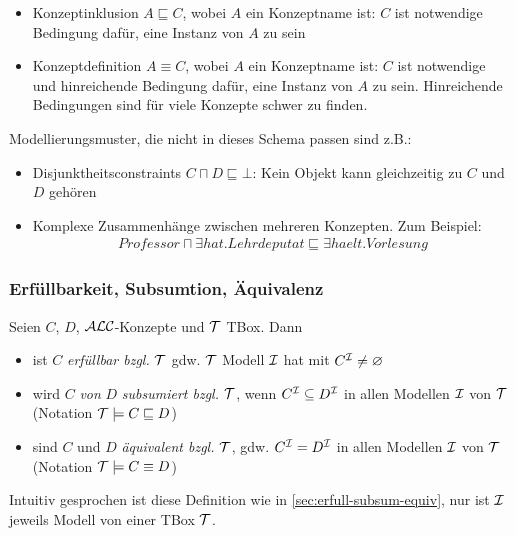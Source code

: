 \begin{itemize}
\item Konzeptinklusion $A \sqsubseteq C$, wobei $A$ ein Konzeptname ist: $C$ ist notwendige Bedingung dafür, eine Instanz von $A$ zu sein
\item Konzeptdefinition $A \equiv C$, wobei $A$ ein Konzeptname ist: $C$ ist notwendige und hinreichende Bedingung dafür, eine Instanz von $A$ zu sein.
    Hinreichende Bedingungen sind für viele Konzepte schwer zu finden.
    \end{itemize}
Modellierungsmuster, die nicht in dieses Schema passen sind z.B.:
\begin{itemize}
\item Disjunktheitsconstraints $C \sqcap D \sqsubseteq \bot$: Kein Objekt kann gleichzeitig zu $C$ und $D$ gehören
\item Komplexe Zusammenhänge zwischen mehreren Konzepten. Zum Beispiel:
    \begin{align*}
        \mathit{Professor} \sqcap \exists \mathit{hat}.\mathit{Lehrdeputat} \sqsubseteq \exists \mathit{haelt}.\mathit{Vorlesung}
    \end{align*}
\end{itemize}

\subsubsection{Erfüllbarkeit, Subsumtion, Äquivalenz}
\label{sec:tbox-erfuellbarkeit}
\label{erfuxfcllbarkeit-subsumtion-uxe4quivalenz-1}

\begin{definition} 
Seien $C$, $D$, $\mathcal{A}\mathcal{L}\mathcal{C}$-Konzepte und $\mathcal{T}$ TBox. Dann

\begin{itemize}
  \item ist $C$ \emph{erfüllbar bzgl.} $\mathcal{T}$ gdw. $\mathcal{T}$ Modell $\mathcal{I}$ hat mit $C^{\mathcal{I}} \neq \varnothing$
  \item wird $C$ \emph{von} $D$ \emph{subsumiert bzgl.} $\mathcal{T}$, wenn $C^{\mathcal{I}} \subseteq D^{\mathcal{I}}$ in allen Modellen $\mathcal{I}$ von $\mathcal{T}$ (Notation $\mathcal{T} \models C \sqsubseteq D$)
  \item sind $C$ und $D$ \emph{äquivalent bzgl.} $\mathcal{T}$, gdw. $C^{\mathcal{I}} = D^{\mathcal{I}}$ in allen Modellen $\mathcal{I}$ von $\mathcal{T}$ (Notation $\mathcal{T} \models C \equiv D$)
\end{itemize}
\end{definition}

Intuitiv gesprochen ist diese Definition wie in
\autoref{sec:erfull-subsum-equiv}, nur ist $\mathcal{I}$ jeweils Modell von einer TBox
$\mathcal{T}$.

